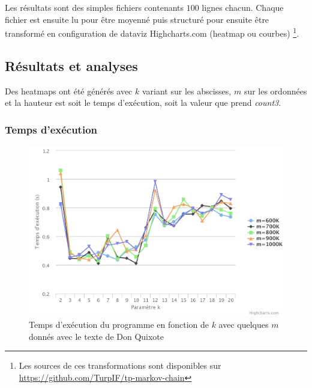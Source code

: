 \documentclass[10pt, a4paper]{article}
\begin{document}
Les résultats sont des simples fichiers contenants $100$ lignes chacun. Chaque
fichier est ensuite lu pour être moyenné puis structuré pour ensuite être
transformé en configuration de dataviz Highcharts.com (heatmap ou courbes)
\footnote{Les sources de ces transformations sont disponibles sur
\url{https://github.com/TurpIF/tp-markov-chain}}. \\

\subsection{Résultats et analyses}

Des heatmaps ont été générés avec $k$ variant sur les abscisses, $m$ sur les
ordonnées et la hauteur est soit le temps d'exécution, soit la valeur que prend
\emph{count3}.

\subsubsection{Temps d'exécution}

\begin{figure}[ht]
    \centering
    \includegraphics[width=1.0\textwidth]{time-don-quixote-plot}
    \caption{Temps d'exécution du programme en fonction de $k$ avec quelques $m$ donnés avec le texte de Don Quixote}
    \label{fig:time-don-quixote-plot}
\end{figure}
\end{document}

